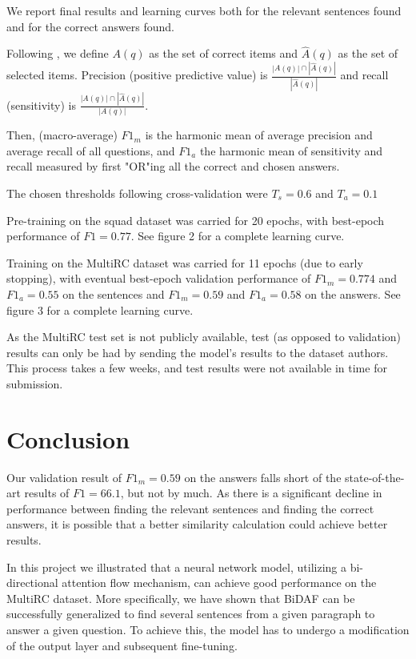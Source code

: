 \documentclass[12pt, a4paper]{article}
\begin{document}
\begin{multicols}{2}
			We report final results and learning curves both for the relevant sentences found and for the correct answers found.
			
			Following \cite{Rajpurkar2018} , we define $ A(q) $ as the set of correct items and $ \hat{A}(q) $ as the set of selected items. Precision (positive predictive value) is $ \frac{|A(q)| \cap |\hat{A}(q)|}{|\hat{A}(q)|} $ and recall (sensitivity) is $ \frac{|A(q)| \cap |\hat{A}(q)|}{|A(q)|} $.
			
			Then, (macro-average) $ F1_m $ is the harmonic mean of average precision and average recall of all questions, and $ F1_a $ the harmonic mean of sensitivity and recall measured by first "OR"ing all the correct and chosen answers.
			
			The chosen thresholds following cross-validation were $ T_s =  0.6$ and $ T_a = 0.1$
		
			Pre-training on the squad dataset was carried for 20 epochs, with best-epoch performance of $ F1 = 0.77 $. See figure 2 for a complete learning curve.
			
			Training on the MultiRC dataset was carried for 11 epochs (due to early stopping), with eventual best-epoch validation performance of $ F1_m = 0.774$ and $ F1_a = 0.55 $ on the sentences and $ F1_m = 0.59 $ and $ F1_a = 0.58 $ on the answers. See figure 3 for a complete learning curve.
			
			As the MultiRC test set is not publicly available, test (as opposed to validation) results can only be had by sending the model's results to the dataset authors. This process takes a few weeks, and test results were not available in time for submission.
			
		\section{Conclusion}
		
			Our validation result of $ F1_m = 0.59 $ on the answers falls short of the state-of-the-art results of $ F1 = 66.1 $, but not by much. As there is a significant decline in performance between finding the relevant sentences and finding the correct answers, it is possible that a better similarity calculation could achieve better results.
		
			In this project we illustrated that a neural network model, utilizing a bi-directional attention flow mechanism, can achieve good performance on the MultiRC dataset. More specifically, we have shown that BiDAF can be successfully generalized to find several sentences from a given paragraph to answer a given question. To achieve this, the model has to undergo a modification of the output layer and subsequent fine-tuning.
			

\end{multicols}
\end{document}

